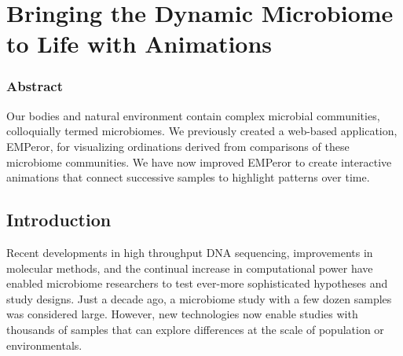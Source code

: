 \glsresetall

\section{Bringing the Dynamic Microbiome to Life with Animations}

\subsubsection{Abstract}

Our bodies and natural environment contain complex microbial communities, colloquially termed microbiomes. We previously created a web-based application, EMPeror, for visualizing ordinations derived from comparisons of these microbiome communities. We have now improved EMPeror to create interactive animations that connect successive samples to highlight patterns over time.

\subsection{Introduction}

Recent developments in high throughput DNA sequencing, improvements in molecular methods, and the continual increase in computational power have enabled microbiome researchers to test ever-more sophisticated hypotheses and study designs. Just a decade ago, a microbiome study with a few dozen samples was considered large. However, new technologies now enable studies with thousands of samples that can explore differences at the scale of population or environmentals.

